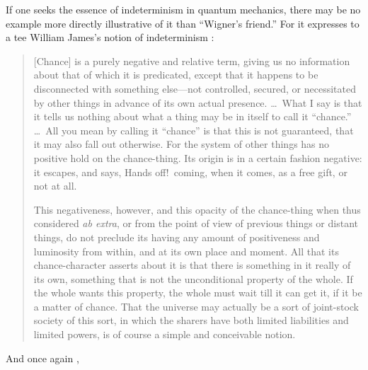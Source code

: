 If one seeks the essence of indeterminism in quantum mechanics, there may be no example more directly illustrative of it than ``Wigner's friend.''  For it expresses to a tee William James's notion of indeterminism \cite{James1884}:
\begin{quotation}\small
[Chance] is a purely negative and relative term, giving us no
information about that of which it is predicated, except that it
happens to be disconnected with something else---not controlled,
secured, or necessitated by other things in advance of its own actual
presence. \ldots\ What I say is that it tells us
nothing about what a thing may be in itself to call it ``chance.'' \ldots\
All you mean by calling it ``chance'' is that this is not guaranteed,
that it may also fall out otherwise. For the system of other things
has no positive hold on the chance-thing. Its origin is in a certain
fashion negative: it escapes, and says, Hands off!\ coming, when it
comes, as a free gift, or not at all.

This negativeness, however, and this opacity of the chance-thing when
thus considered {\it ab extra}, or from the point of view of previous
things or distant things, do not preclude its having any amount of
positiveness and luminosity from within, and at its own place and
moment. All that its chance-character asserts about it is that there
is something in it really of its own, something that is not the
unconditional property of the whole. If the whole wants this
property, the whole must wait till it can get it, if it be a matter
of chance. That the universe may actually be a sort of joint-stock
society of this sort, in which the sharers have both limited
liabilities and limited powers, is of course a simple and conceivable
notion.
\end{quotation}
And once again \cite{JamesOSH},
